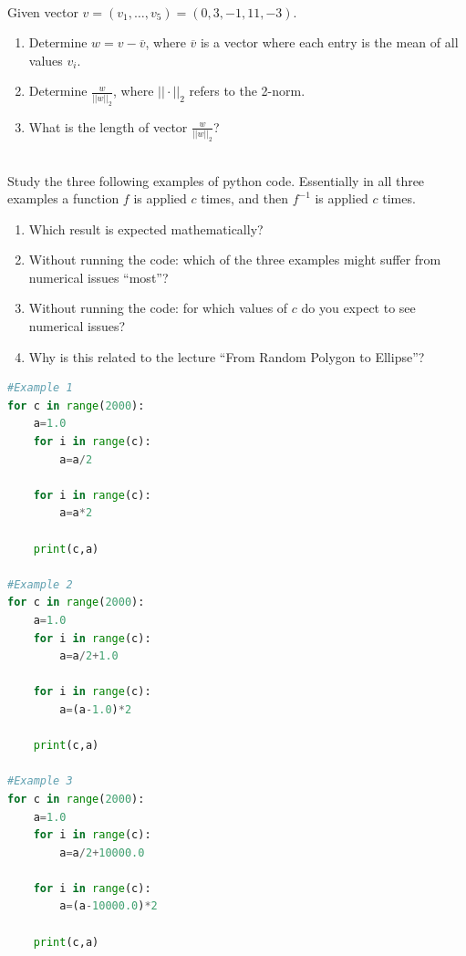 \documentclass[10pt]{article}
\begin{document}
\\
 Given vector $v=(v_1, \ldots, v_5) = (0,3,-1,11,-3)$.
\begin{enumerate}
\item Determine $w=v-\overline{v}$, where $\overline{v}$ is a
  vector where each entry is the mean of all values $v_i$.
\item Determine $\frac{w}{||w||_2}$, where $||\cdot||_2$ refers to the 2-norm.
\item What is the length of vector $\frac{w}{||w||_2}$?
\end{enumerate}

\\

Study the three following examples of python code. Essentially in all
three examples a function $f$ is applied $c$ times, and then $f^{-1}$
is applied $c$ times.
\begin{enumerate}
\item Which result is expected mathematically?
\item Without running the code: which of the three examples might
  suffer from numerical issues ``most''?
\item Without running the code: for which values of $c$ do you expect
  to see numerical issues? 
\item Why is this related to the lecture ``From Random
  Polygon to Ellipse''?
\end{enumerate}
\newpage
\begin{lstlisting}[language=Python]
#Example 1
for c in range(2000):
    a=1.0
    for i in range(c):
        a=a/2
    
    for i in range(c):
        a=a*2
    
    print(c,a)

#Example 2
for c in range(2000):
    a=1.0
    for i in range(c):
        a=a/2+1.0
    
    for i in range(c):
        a=(a-1.0)*2
    
    print(c,a)

#Example 3
for c in range(2000):
    a=1.0
    for i in range(c):
        a=a/2+10000.0
    
    for i in range(c):
        a=(a-10000.0)*2
    
    print(c,a)
\end{lstlisting}
\end{document}
